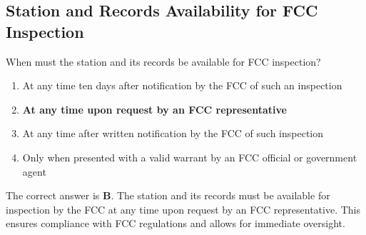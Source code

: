 \subsection{Station and Records Availability for FCC Inspection}
\label{T1F01}

\begin{tcolorbox}[colback=gray!10!white,colframe=black!75!black,title=T1F01]
When must the station and its records be available for FCC inspection?
\begin{enumerate}[label=\Alph*,noitemsep]
    \item At any time ten days after notification by the FCC of such an inspection
    \item \textbf{At any time upon request by an FCC representative}
    \item At any time after written notification by the FCC of such inspection
    \item Only when presented with a valid warrant by an FCC official or government agent
\end{enumerate}
\end{tcolorbox}

The correct answer is \textbf{B}. The station and its records must be available for inspection by the FCC at any time upon request by an FCC representative. This ensures compliance with FCC regulations and allows for immediate oversight.